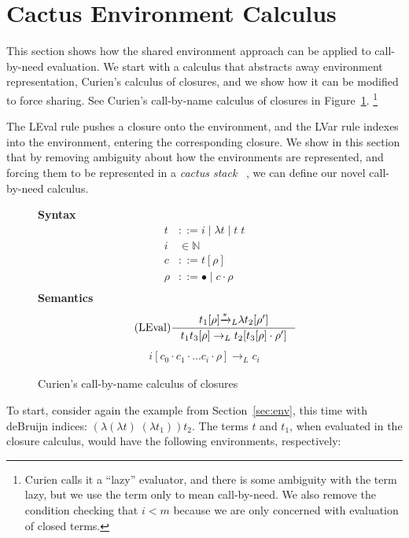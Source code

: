 \section{Cactus Environment Calculus} \label{sec:calc}

This section shows how the shared environment approach can be applied to
call-by-need evaluation. We start with a calculus that abstracts away
environment representation, Curien's calculus of closures, and we show how it
can be modified to force sharing. See Curien's call-by-name calculus of closures
in Figure~\ref{fig:calcclos}. \footnote{Curien calls it a ``lazy'' evaluator, and
there is some ambiguity with the term lazy, but we use the term only to mean
call-by-need. We also remove the condition checking that $i < m$ because we are
only concerned with evaluation of closed terms.}

The LEval rule pushes a closure onto the environment, and the LVar rule indexes
into the environment, entering the corresponding closure. We show in this
section that by removing ambiguity about how the environments are represented,
and forcing them to be represented in a \emph{cactus stack}
~\cite{stenstrom1988vlsi}, we can define our novel call-by-need calculus.

\begin{figure}
\textbf{Syntax}
\begin{align*}
\tag{Term} t &::= i \; | \; \lambda t \; | \; t \; t  \\
\tag{Variable} i &\in \mathbb{N}  \\
\tag{Closure} c &::= t [\rho] \\
\tag{Environment} \rho &::= \bullet \; | \; c \cdot \rho \\
\end{align*}
\textbf{Semantics}
\begin{align*}
\tag{LEval}\inference
{t_1[\rho] {\xrightarrow{* }}_L \lambda t_2[\rho'] }
{t_1 t_3[\rho] \rightarrow_L t_2[t_3[\rho] \cdot \rho'] } 
\end{align*}
\begin{align*}
\tag{LVar} i [c_0 \cdot c_1 \cdot ... c_i \cdot \rho] \rightarrow_L c_i
\end{align*}
\caption{Curien's call-by-name calculus of closures ~\cite{curien1991abstract}}
\label{fig:calcclos}
\end{figure}

To start, consider again the example from Section~\ref{sec:env}, this
time with deBruijn indices: $(\lambda(\lambda t) \; (\lambda t_1)) t_2$.  The
terms $t$ and $t_1$, when evaluated in the closure calculus, would have the
following environments, respectively: 


